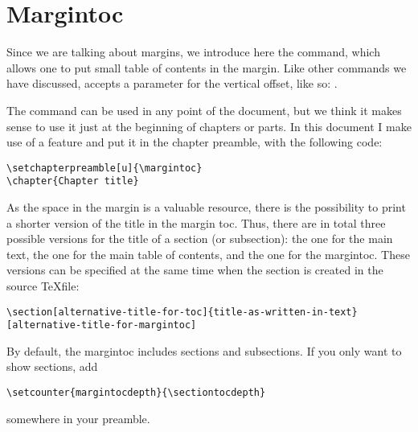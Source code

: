 \section{Margintoc}

Since we are talking about margins, we introduce here the 
 command, which allows one to put small table of 
contents in the margin. Like other commands we have discussed, 
 accepts a parameter for the vertical offset, like 
so: .

The command can be used in any point of the document, but we think it 
makes sense to use it just at the beginning of chapters or parts. In 
this document I make use of a \KOMAScript\xspace feature and put it in 
the chapter preamble, with the following code:


\begin{lstlisting}[style=kaolstplain]
\setchapterpreamble[u]{\margintoc}
\chapter{Chapter title}
\end{lstlisting}

As the space in the margin is a valuable resource, there is the 
possibility to print a shorter version of the title in the margin toc. 
Thus, there are in total three possible versions for the title of a 
section (or subsection): the one for the main text, the one for the main 
table of contents, and the one for the margintoc. These versions can be 
specified at the same time when the section is created in the source 
\TeX file:
\begin{lstlisting}[style=kaolstplain]
\section[alternative-title-for-toc]{title-as-written-in-text}[alternative-title-for-margintoc]
\end{lstlisting}

By default, the margintoc includes sections and subsections.
If you only want to show sections, add
\begin{lstlisting}[style=kaolstplain]
\setcounter{margintocdepth}{\sectiontocdepth}
\end{lstlisting}
somewhere in your preamble.

